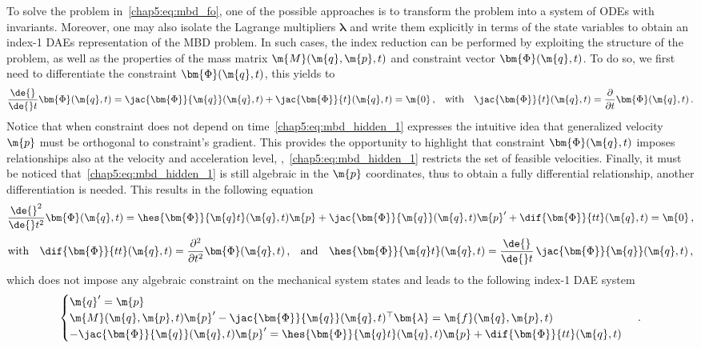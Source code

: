 To solve the problem in~\eqref{chap5:eq:mbd_fo}, one of the possible approaches is to transform the problem into a system of \acp{ODE} with invariants. Moreover, one may also isolate the Lagrange multipliers $\bm{\lambda}$ and write them explicitly in terms of the state variables to obtain an index-1 \acp{DAE} representation of the \ac{MBD} problem. In such cases, the index reduction can be performed by exploiting the structure of the problem, as well as the properties of the mass matrix $\m{M}(\m{q}, \m{p}, t)$ and constraint vector $\bm{\Phi}(\m{q}, t)$. To do so, we first need to differentiate the constraint $\bm{\Phi}(\m{q}, t)$, this yields to
%
\begin{equation}
  \dfrac{\de{}}{\de{} t}\bm{\Phi}(\m{q}, t) = \jac{\bm{\Phi}}{\m{q}}(\m{q}, t) + \jac{\bm{\Phi}}{t}(\m{q}, t) = \m{0}
  \, \text{,}
  \quad \text{with} \quad \jac{\bm{\Phi}}{t}(\m{q}, t) = \dfrac{\partial}{\partial t}\bm{\Phi}(\m{q}, t)
  \, \text{.}
  \label{chap5:eq:mbd_hidden_1}
\end{equation}
%
Notice that when constraint does not depend on time~\eqref{chap5:eq:mbd_hidden_1} expresses the intuitive idea that generalized velocity $\m{p}$ must be orthogonal to constraint's gradient. This provides the opportunity to highlight that constraint $\bm{\Phi}(\m{q}, t)$ imposes relationships also at the velocity and acceleration level, \ie{},~\eqref{chap5:eq:mbd_hidden_1} restricts the set of feasible velocities. Finally, it must be noticed that~\eqref{chap5:eq:mbd_hidden_1} is still algebraic in the $\m{p}$ coordinates, thus to obtain a fully differential relationship, another differentiation is needed. This results in the following equation
%
\begin{equation}
  \dfrac{\de{}^2}{\de{}t^2}\bm{\Phi}(\m{q}, t) = \hes{\bm{\Phi}}{\m{q}t}(\m{q}, t)\m{p} + \jac{\bm{\Phi}}{\m{q}}(\m{q}, t)\m{p}^{\prime} + \dif{\bm{\Phi}}{tt}(\m{q}, t) = \m{0} \, \text{,}
  \label{chap5:eq:mbd_hidden_2}
\end{equation}
\begin{equation*}
  \text{with} \quad
  \dif{\bm{\Phi}}{tt}(\m{q}, t) = \dfrac{\partial^2}{\partial t^2}\bm{\Phi}(\m{q}, t) \, \text{,}
  \quad \text{and} \quad
  \hes{\bm{\Phi}}{\m{q}t}(\m{q}, t) = \dfrac{\de{}}{\de{} t}\,\jac{\bm{\Phi}}{\m{q}}(\m{q}, t) \, \text{,}
\end{equation*}
%
which does not impose any algebraic constraint on the mechanical system states and leads to the following index-1 \ac{DAE} system
%
\begin{equation}
  \begin{cases}
    \m{q}^{\prime} = \m{p} \\
    \m{M}(\m{q}, \m{p}, t)\m{p}^{\prime} - \jac{\bm{\Phi}}{\m{q}}(\m{q}, t)^{\top}\bm{\lambda} = \m{f}(\m{q},\m{p},t) \\
    -\jac{\bm{\Phi}}{\m{q}}(\m{q}, t)\m{p}^{\prime} = \hes{\bm{\Phi}}{\m{q}t}(\m{q}, t)\m{p} + \dif{\bm{\Phi}}{tt}(\m{q}, t)
  \end{cases} \, \text{.}
  \label{chap5:eq:mbd_ode}
\end{equation}
